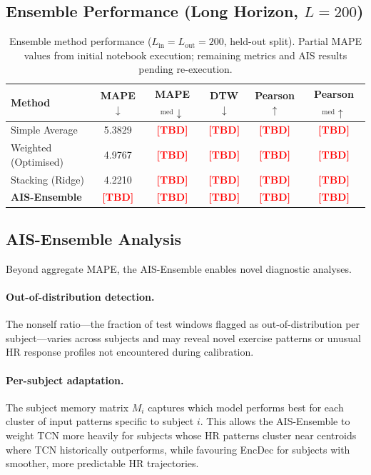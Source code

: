 \documentclass[11pt,a4paper]{article}
\newcommand{\TBD}{\textcolor{red}{\textbf{[TBD]}}}
\begin{document}
\subsection{Ensemble Performance (Long Horizon, $L=200$)}

\begin{table}[H]
  \centering
  \caption{Ensemble method performance ($L_{\mathrm{in}}=L_{\mathrm{out}}=200$,
           held-out split).  Partial MAPE values from initial notebook
           execution; remaining metrics and AIS results pending
           re-execution.}
  \label{tab:ensemble_200}
  \begin{tabular}{lccccc}
    \toprule
    Method & MAPE$\downarrow$ & MAPE$_{\mathrm{med}}\downarrow$ &
             DTW$\downarrow$ & Pearson$\uparrow$ &
             Pearson$_{\mathrm{med}}\uparrow$ \\
    \midrule
    Simple Average       & 5.3829 & \TBD & \TBD & \TBD & \TBD \\
    Weighted (Optimised) & 4.9767 & \TBD & \TBD & \TBD & \TBD \\
    Stacking (Ridge)     & 4.2210 & \TBD & \TBD & \TBD & \TBD \\
    \textbf{AIS-Ensemble}& \TBD   & \TBD & \TBD & \TBD & \TBD \\
    \bottomrule
  \end{tabular}
\end{table}

\subsection{AIS-Ensemble Analysis}
\label{ssec:ais_results}

Beyond aggregate MAPE, the AIS-Ensemble enables novel diagnostic analyses.

\paragraph{Out-of-distribution detection.}
The nonself ratio—the fraction of test windows flagged as out-of-distribution
per subject—varies across subjects and may reveal novel exercise patterns or
unusual HR response profiles not encountered during calibration.

\paragraph{Per-subject adaptation.}
The subject memory matrix $M_i$ captures which model performs best for each
cluster of input patterns specific to subject $i$.  This allows the
AIS-Ensemble to weight TCN more heavily for subjects whose HR patterns cluster
near centroids where TCN historically outperforms, while favouring EncDec for
subjects with smoother, more predictable HR trajectories.
\end{document}
